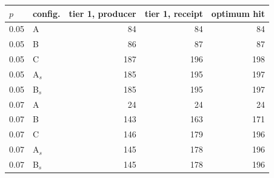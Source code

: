 \begin{tabular}{@{}llrrr@{}}
\toprule
$p$ & config. & tier 1, producer & tier 1, receipt & optimum hit \\
\midrule
0.05 & A & 84 & 84 & 84 \\
0.05 & B & 86 & 87 & 87 \\
0.05 & C & 187 & 196 & 198 \\
0.05 & A$_s$ & 185 & 195 & 197 \\
0.05 & B$_s$ & 185 & 195 & 197 \\
0.07 & A & 24 & 24 & 24 \\
0.07 & B & 143 & 163 & 171 \\
0.07 & C & 146 & 179 & 196 \\
0.07 & A$_s$ & 145 & 178 & 196 \\
0.07 & B$_s$ & 145 & 178 & 196 \\
\bottomrule
\end{tabular}

